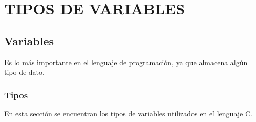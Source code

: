 \part[VARIABLES]{TIPOS DE VARIABLES}

\chapter[Variables]{Variables}
	\raggedright
	Es lo más importante en el lenguaje de programación, ya que almacena algún tipo de dato. 
\section [Tipos]{Tipos}
	\raggedright
	En esta sección se encuentran los tipos de variables utilizados en el lenguaje C.


